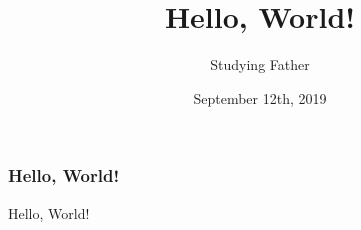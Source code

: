 \documentclass{beamer}
\title{Hello, World!}
\author{Studying Father}
\institute{SFOI Team}
\date{September 12th, 2019}
\begin{document}
    \frame{\titlepage}%

    \begin{frame}
        \frametitle{Hello, World!}
        Hello, World!
    \end{frame}
\end{document}
